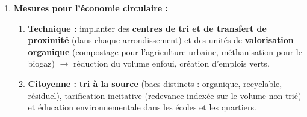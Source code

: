 \documentclass[11pt]{article}
\begin{document}
\begin{exoresolu}
\begin{enumerate}
    \begin{itemize}
        \item \textbf{Accessibilité :} voirie inexistante ou impraticable pour les bennes (rues étroites, non loties).
        \item \textbf{Foncier :} zones non loties, conflits fonciers, flou de responsabilité entre commune et opérateur.
        \item \textbf{Comportements :} absence de culture du tri, habitudes de dépôt dans les ravins et cours d'eau, refus de payer la redevance de propreté.
    \end{itemize}
    \item \textbf{Mesures pour l'économie circulaire :}
    \begin{enumerate}
        \item \textbf{Technique :} implanter des \textbf{centres de tri et de transfert de proximité} (dans chaque arrondissement) et des unités de \textbf{valorisation organique} (compostage pour l'agriculture urbaine, méthanisation pour le biogaz) $\rightarrow$ réduction du volume enfoui, création d'emplois verts.
        \item \textbf{Citoyenne :} \textbf{tri à la source} (bacs distincts : organique, recyclable, résiduel), tarification incitative (redevance indexée sur le volume non trié) et éducation environnementale dans les écoles et les quartiers.
    \end{enumerate}
\end{enumerate}
\end{exoresolu}
\end{document}
